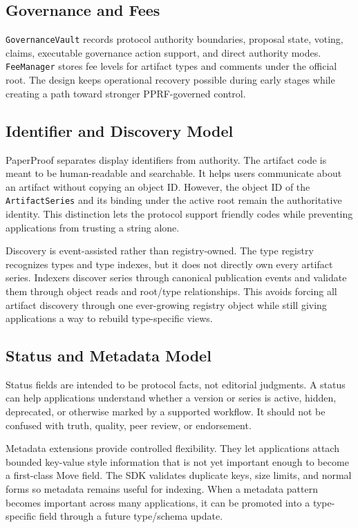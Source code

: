 \documentclass[journal]{IEEEtran}
\newcommand{\artifact}{\texttt{ArtifactSeries}}
\begin{document}
\subsection{Governance and Fees}

\texttt{GovernanceVault} records protocol authority boundaries, proposal state, voting, claims, executable governance action support, and direct authority modes. \texttt{FeeManager} stores fee levels for artifact types and comments under the official root. The design keeps operational recovery possible during early stages while creating a path toward stronger PPRF-governed control.

\subsection{Identifier and Discovery Model}

PaperProof separates display identifiers from authority. The artifact code is meant to be human-readable and searchable. It helps users communicate about an artifact without copying an object ID. However, the object ID of the \artifact{} and its binding under the active root remain the authoritative identity. This distinction lets the protocol support friendly codes while preventing applications from trusting a string alone.

Discovery is event-assisted rather than registry-owned. The type registry recognizes types and type indexes, but it does not directly own every artifact series. Indexers discover series through canonical publication events and validate them through object reads and root/type relationships. This avoids forcing all artifact discovery through one ever-growing registry object while still giving applications a way to rebuild type-specific views.

\subsection{Status and Metadata Model}

Status fields are intended to be protocol facts, not editorial judgments. A status can help applications understand whether a version or series is active, hidden, deprecated, or otherwise marked by a supported workflow. It should not be confused with truth, quality, peer review, or endorsement.

Metadata extensions provide controlled flexibility. They let applications attach bounded key-value style information that is not yet important enough to become a first-class Move field. The SDK validates duplicate keys, size limits, and normal forms so metadata remains useful for indexing. When a metadata pattern becomes important across many applications, it can be promoted into a type-specific field through a future type/schema update.
\end{document}
